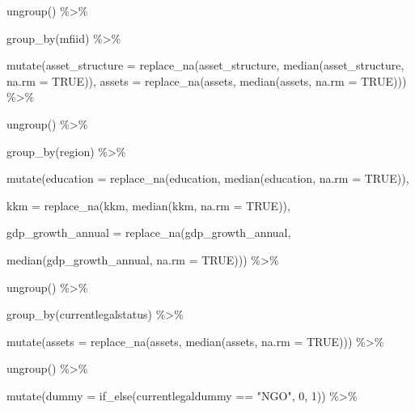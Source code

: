 \documentclass[a4paper,nobind]{templates/ociamthesis}
\newenvironment{Shaded}{\begin{snugshade}}{\end{snugshade}}
\newcommand{\AttributeTok}[1]{\textcolor[rgb]{0.77,0.63,0.00}{#1}}
\newcommand{\ConstantTok}[1]{\textcolor[rgb]{0.00,0.00,0.00}{#1}}
\newcommand{\DecValTok}[1]{\textcolor[rgb]{0.00,0.00,0.81}{#1}}
\newcommand{\FunctionTok}[1]{\textcolor[rgb]{0.00,0.00,0.00}{#1}}
\newcommand{\NormalTok}[1]{#1}
\newcommand{\SpecialCharTok}[1]{\textcolor[rgb]{0.00,0.00,0.00}{#1}}
\newcommand{\StringTok}[1]{\textcolor[rgb]{0.31,0.60,0.02}{#1}}
\renewenvironment{Shaded}
{
  \vspace{10pt}%
  \begin{snugshade}%
}{%
  \end{snugshade}%
  \vspace{8pt}%
}
\begin{document}
\begin{Shaded}
\begin{Highlighting}[]
  \FunctionTok{ungroup}\NormalTok{() }\SpecialCharTok{\%\textgreater{}\%} 
  
  \FunctionTok{group\_by}\NormalTok{(mfiid) }\SpecialCharTok{\%\textgreater{}\%} 
  
  \FunctionTok{mutate}\NormalTok{(}\AttributeTok{asset\_structure =} \FunctionTok{replace\_na}\NormalTok{(asset\_structure, }\FunctionTok{median}\NormalTok{(asset\_structure, }\AttributeTok{na.rm =} \ConstantTok{TRUE}\NormalTok{)), }\AttributeTok{assets =} \FunctionTok{replace\_na}\NormalTok{(assets, }\FunctionTok{median}\NormalTok{(assets, }\AttributeTok{na.rm =} \ConstantTok{TRUE}\NormalTok{))) }\SpecialCharTok{\%\textgreater{}\%} 
  
  \FunctionTok{ungroup}\NormalTok{() }\SpecialCharTok{\%\textgreater{}\%} 
  
  \FunctionTok{group\_by}\NormalTok{(region) }\SpecialCharTok{\%\textgreater{}\%} 
  
  \FunctionTok{mutate}\NormalTok{(}\AttributeTok{education =} \FunctionTok{replace\_na}\NormalTok{(education, }\FunctionTok{median}\NormalTok{(education, }\AttributeTok{na.rm =} \ConstantTok{TRUE}\NormalTok{)),}
         
         \AttributeTok{kkm =} \FunctionTok{replace\_na}\NormalTok{(kkm, }\FunctionTok{median}\NormalTok{(kkm, }\AttributeTok{na.rm =} \ConstantTok{TRUE}\NormalTok{)),}
         
         \AttributeTok{gdp\_growth\_annual =} \FunctionTok{replace\_na}\NormalTok{(gdp\_growth\_annual, }
                                        
         \FunctionTok{median}\NormalTok{(gdp\_growth\_annual, }\AttributeTok{na.rm =} \ConstantTok{TRUE}\NormalTok{))) }\SpecialCharTok{\%\textgreater{}\%} 
  
  \FunctionTok{ungroup}\NormalTok{() }\SpecialCharTok{\%\textgreater{}\%} 
  
  \FunctionTok{group\_by}\NormalTok{(currentlegalstatus) }\SpecialCharTok{\%\textgreater{}\%} 
  
  \FunctionTok{mutate}\NormalTok{(}\AttributeTok{assets =} \FunctionTok{replace\_na}\NormalTok{(assets, }\FunctionTok{median}\NormalTok{(assets, }\AttributeTok{na.rm =} \ConstantTok{TRUE}\NormalTok{))) }\SpecialCharTok{\%\textgreater{}\%} 
  
  \FunctionTok{ungroup}\NormalTok{() }\SpecialCharTok{\%\textgreater{}\%} 
  
  \FunctionTok{mutate}\NormalTok{(}\AttributeTok{dummy =} \FunctionTok{if\_else}\NormalTok{(currentlegaldummy }\SpecialCharTok{==} \StringTok{"NGO"}\NormalTok{, }\DecValTok{0}\NormalTok{, }\DecValTok{1}\NormalTok{)) }\SpecialCharTok{\%\textgreater{}\%} 
  

\end{Highlighting}
\end{Shaded}
\end{document}
